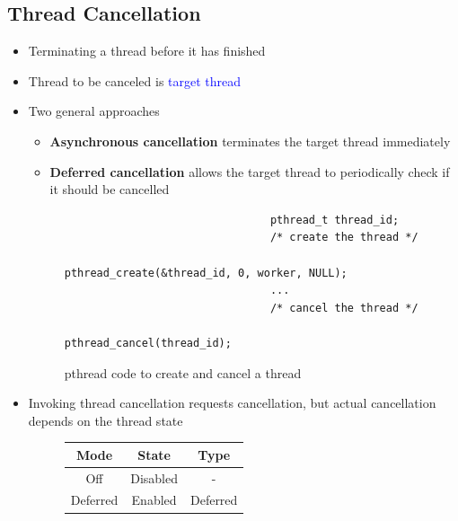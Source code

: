 \documentclass[oneside]{book}
\begin{document}
            \subsection{Thread Cancellation}
                \begin{itemize}
                    \item Terminating a thread before it has finished
                    \item Thread to be canceled is \textcolor{blue}{target thread}
                    \item Two general approaches
                        \begin{itemize}
                            \item \textbf{Asynchronous cancellation} terminates the target thread immediately
                            \item \textbf{Deferred cancellation} allows the target thread to periodically check if it should be cancelled
                        \end{itemize}
                        \begin{figure}[H]
                            \begin{verbatim}
                                pthread_t thread_id;
                                /* create the thread */
                                pthread_create(&thread_id, 0, worker, NULL);
                                ...
                                /* cancel the thread */
                                pthread_cancel(thread_id);
                            \end{verbatim}
                            \caption{pthread code to create and cancel a thread}
                        \end{figure}
                    \item Invoking thread cancellation requests cancellation, but actual cancellation depends on the thread state
                        \begin{figure}[H]
                            \centering
                            \begin{tabular}{|c|c|c|}
                                \hline
                                \textbf{Mode} & \textbf{State} & \textbf{Type}\\
                                \hline
                                Off & Disabled & -\\
                                \hline
                                Deferred & Enabled & Deferred\\

\end{tabular}
\end{figure}
\end{itemize}
\end{document}
